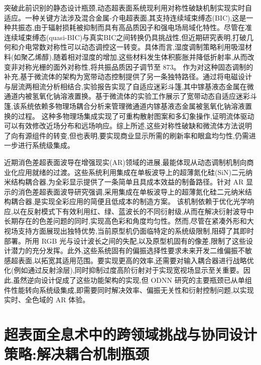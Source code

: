 \documentclass[11pt]{article}
\begin{document}
突破此前识别的静态设计瓶颈,动态超表面系统现利用对称性破缺机制实现实时自适应。一种关键方法涉及混合金属-介电超表面,其支持连续域束缚态(BIC),这是一种共振态,由于辐射损耗被抑制而具有高品质因子和强电场局域化特性。尽管在准连续域束缚态(quasi-BIC)与真实BIC之间转换仍具挑战性,但近期研究表明,打破几何和介电常数对称性可以动态调控这一转变。具体而言,湿度调制策略利用吸湿材料(如聚乙烯醇),随着相对湿度的增加,这些材料发生体积膨胀并降低折射率,从而改变非对称光栅的面外对称性,将共振品质因子调节至 873。\citep{doi_10_1002_adpr_202400191_88f03cd9} \citep{doi_10_1364_oe_574568_72469f3c} 作为对这种固态调制的补充,基于微流体的架构为宽带动态控制提供了另一条独特路径。通过将电磁设计与层流两相流分析相结合,实验报告实现了自适应迷彩斗篷,其中镓基液态金属在微通道内被氢氧化钠溶液置换。基于微流体的实验工作展示了宽带动态自适应迷彩斗篷,该系统依赖多物理场耦合分析来管理微通道内镓基液态金属被氢氧化钠溶液置换的过程。\citep{doi_10_1002_lpor_202500327_a3bf6deb} 这种多物理场集成实现了可重构散射图案和多幻象操作,证明流体驱动可以有效修改近场分布和远场响应。综上所述,这些对称性破缺和微流体方法说明了向有源组件的转变,但也表明,要实现商业显示所需的刷新率和眼盒均匀性,仍需进一步进行系统级集成。\citep{doi_10_1002_adpr_202400191_88f03cd9} \citep{doi_10_1002_lpor_202500327_a3bf6deb}

近期消色差超表面波导在增强现实(AR)领域的进展,最能体现从动态调制机制向商业化应用就绪的过渡。这些系统利用集成在单板波导上的超薄氮化硅(SiN)二元纳米结构耦合器,为全彩显示提供了一条简单且具成本效益的制备路径。针对 AR 显示的消色差超表面波导研究强调,采用集成在单板波导上的超薄氮化硅二元纳米结构耦合器,是实现全彩应用的简便且低成本的制造方案。\citep{doi_10_1038_s41377_025_01761_w_a73a6b84} 该机制依赖于优化光学响应,以在反射模式下有效利用红、绿、蓝波长的不同衍射级,从而在解决衍射波导中长期存在的色差问题的同时,实现高色彩和角度均匀性。然而,尽管在紧凑外形和大视场支持方面展现出独特优势,当前原型机仍面临特定的系统级限制,阻碍了其即时部署。所用 RGB 光与设计波长之间的失配,以及原型机固有的像差,限制了这些设计潜力的充分发挥。此外,这些系统固有的偏振选择性要求未来开发二维偏振不敏感超表面,以拓宽其适用范围。要实现更高的效率,还需要对输入耦合器进行战略优化(例如通过反射涂层),同时抑制过度高阶衍射对于实现宽视场显示至关重要。因此,虽然逆向设计促成了这些功能架构的实现,但 ODNN 研究的主要瓶颈已从单组件性能转向系统级集成,即需要同时解决效率、偏振无关性和衍射控制问题,以实现实时、全色域的 AR 体验。\citep{doi_10_1038_s41377_025_01761_w_a73a6b84}

\section{超表面全息术中的跨领域挑战与协同设计策略:解决耦合机制瓶颈}\label{ux8d85ux8868ux9762ux5168ux606fux672fux4e2dux7684ux8de8ux9886ux57dfux6311ux6218ux4e0eux534fux540cux8bbeux8ba1ux7b56ux7565ux89e3ux51b3ux8026ux5408ux673aux5236ux74f6ux9888}
\end{document}
